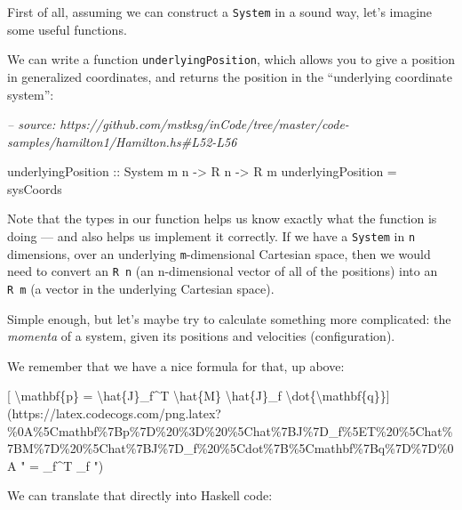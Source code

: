 \documentclass[]{article}
\newenvironment{Shaded}{}{}
\newcommand{\CommentTok}[1]{\textcolor[rgb]{0.38,0.63,0.69}{\textit{#1}}}
\newcommand{\DataTypeTok}[1]{\textcolor[rgb]{0.56,0.13,0.00}{#1}}
\newcommand{\FunctionTok}[1]{\textcolor[rgb]{0.02,0.16,0.49}{#1}}
\newcommand{\NormalTok}[1]{#1}
\newcommand{\OtherTok}[1]{\textcolor[rgb]{0.00,0.44,0.13}{#1}}
\begin{document}
First of all, assuming we can construct a \texttt{System} in a sound way, let's
imagine some useful functions.

We can write a function \texttt{underlyingPosition}, which allows you to give a
position in generalized coordinates, and returns the position in the
``underlying coordinate system'':

\begin{Shaded}
\begin{Highlighting}[]
\CommentTok{-- source: https://github.com/mstksg/inCode/tree/master/code-samples/hamilton1/Hamilton.hs#L52-L56}

\NormalTok{underlyingPosition}
\OtherTok{    ::} \DataTypeTok{System}\NormalTok{ m n}
    \OtherTok{->} \DataTypeTok{R}\NormalTok{ n}
    \OtherTok{->} \DataTypeTok{R}\NormalTok{ m}
\NormalTok{underlyingPosition }\FunctionTok{=}\NormalTok{ sysCoords}
\end{Highlighting}
\end{Shaded}

Note that the types in our function helps us know exactly what the function is
doing --- and also helps us implement it correctly. If we have a \texttt{System}
in \texttt{n} dimensions, over an underlying \texttt{m}-dimensional Cartesian
space, then we would need to convert an \texttt{R\ n} (an n-dimensional vector
of all of the positions) into an \texttt{R\ m} (a vector in the underlying
Cartesian space).

Simple enough, but let's maybe try to calculate something more complicated: the
\emph{momenta} of a system, given its positions and velocities (configuration).

We remember that we have a nice formula for that, up above:

{[} \textbackslash{}mathbf\{p\} = \textbackslash{}hat\{J\}\_f\^{}T
\textbackslash{}hat\{M\} \textbackslash{}hat\{J\}\_f
\textbackslash{}dot\{\textbackslash{}mathbf\{q\}\}{]}(https://latex.codecogs.com/png.latex?\%0A\%5Cmathbf\%7Bp\%7D\%20\%3D\%20\%5Chat\%7BJ\%7D\_f\%5ET\%20\%5Chat\%7BM\%7D\%20\%5Chat\%7BJ\%7D\_f\%20\%5Cdot\%7B\%5Cmathbf\%7Bq\%7D\%7D\%0A
"  = \_f\^{}T  \_f  ")

We can translate that directly into Haskell code:
\end{document}
